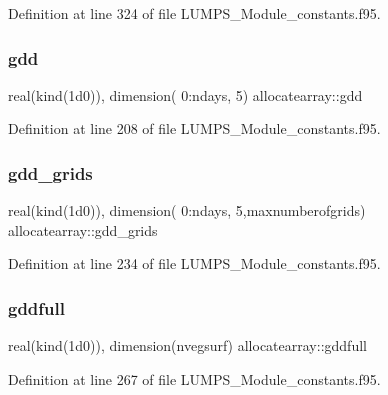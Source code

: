 Definition at line 324 of file L\+U\+M\+P\+S\+\_\+\+Module\+\_\+constants.\+f95.

\mbox{\label{namespaceallocatearray_a75b46c8914271b763866d92533f09b19}} 
\subsubsection{\texorpdfstring{gdd}{gdd}}
{\footnotesize\ttfamily real(kind(1d0)), dimension( 0\+:ndays, 5) allocatearray\+::gdd}



Definition at line 208 of file L\+U\+M\+P\+S\+\_\+\+Module\+\_\+constants.\+f95.

\mbox{\label{namespaceallocatearray_a8102d2a0006650f97b2b240a515fffac}} 
\subsubsection{\texorpdfstring{gdd\+\_\+grids}{gdd\_grids}}
{\footnotesize\ttfamily real(kind(1d0)), dimension( 0\+:ndays, 5,maxnumberofgrids) allocatearray\+::gdd\+\_\+grids}



Definition at line 234 of file L\+U\+M\+P\+S\+\_\+\+Module\+\_\+constants.\+f95.

\mbox{\label{namespaceallocatearray_ae49dddcd41fe5e50e947da3ecdfeae49}} 
\subsubsection{\texorpdfstring{gddfull}{gddfull}}
{\footnotesize\ttfamily real(kind(1d0)), dimension(nvegsurf) allocatearray\+::gddfull}



Definition at line 267 of file L\+U\+M\+P\+S\+\_\+\+Module\+\_\+constants.\+f95.

\mbox{\label{namespaceallocatearray_a414bbbb4213968c827d816bf384610ed}} 
